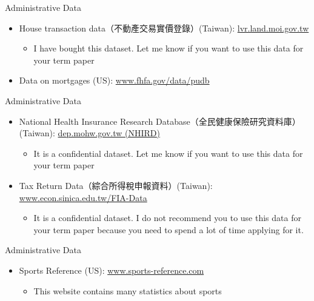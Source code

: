 \documentclass[hyperref={pdfpagelabels=false}]{beamer}
\begin{document}
\begin{frame}{Administrative Data}
\begin{itemize} 
	\item House transaction data（不動產交易實價登錄）(Taiwan): \href{https://lvr.land.moi.gov.tw/}{lvr.land.moi.gov.tw}  
	\vspace{0.3cm}
	\begin{itemize}
		\item I have bought this dataset. Let me know if you want to use this data for your term paper
	\end{itemize}
	\vspace{0.3cm}
	\item Data on mortgages (US): \href{https://www.fhfa.gov/data/pudb}{www.fhfa.gov/data/pudb}
	
	
\end{itemize}
\end{frame}







\begin{frame}{Administrative Data}
\begin{itemize} 
\item National Health Insurance Research Database（全民健康保險研究資料庫）(Taiwan): \href{https://dep.mohw.gov.tw/DOHDS/cp-4447-36290-113.html}{dep.mohw.gov.tw (NHIRD)}  
\vspace{0.3cm}
\begin{itemize}
	\item It is a confidential dataset. Let me know if you want to use this data for your term paper
\end{itemize}
\vspace{0.3cm}
\item Tax Return Data（綜合所得稅申報資料）(Taiwan): \href{https://www.econ.sinica.edu.tw/FIA-Data}{www.econ.sinica.edu.tw/FIA-Data}
\begin{itemize}
	\vspace{0.3cm}
	\item It is a confidential dataset. I do not recommend you to use this data for your term paper because you need to spend a lot of time applying for it.
\end{itemize}

\end{itemize}
\end{frame}


\begin{frame}{Administrative Data}
\begin{itemize} 
	\item Sports Reference (US): \href{https://www.sports-reference.com/}{www.sports-reference.com}  
	\vspace{0.3cm}
	\begin{itemize}
		\item This website contains many statistics about sports
	\end{itemize}
	
	
\end{itemize}
\end{frame}
\end{document}
